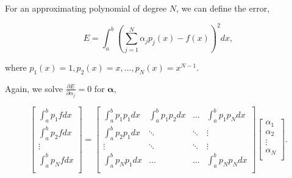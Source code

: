 \documentclass[12pt]{article}
\begin{document}
For an approximating polynomial of degree $N$, we can define the error,

\vspace{4mm}

$$ E = \int_{a}^{b} \left(\sum_{j=1}^N \alpha_j p_j (x) - f(x)\right)^2 dx, $$

\vspace{5mm}

where $p_1(x)=1, p_2(x) = x, ..., p_N(x)=x^{N-1}$.

\vspace{5mm}

Again, we solve $\frac{\partial E}{\partial \alpha_j} = 0$ for $\boldsymbol{\alpha}$,

\vspace{4mm}

\[
\begin{bmatrix}
	\int_{a}^{b} p_1 f dx \\[2ex]
	\int_{a}^{b} p_2 f dx \\[2ex]
	\vdots \\[2ex]
	\int_{a}^{b} p_N f dx \\[2ex]
\end{bmatrix} 
=
\begin{bmatrix}
  	\int_{a}^{b} p_1 p_1 dx & \int_{a}^{b} p_1 p_2 dx & \dots & \int_{a}^{b} p_1 p_N dx \\[2ex]
    \int_{a}^{b} p_2 p_1 dx & \ddots & \ddots & \vdots \\[2ex]
    \vdots & \ddots & \ddots & \vdots \\[2ex]
    \int_{a}^{b} p_N p_1 dx & \dots & \dots & \int_{a}^{b} p_N p_N dx \\[2ex]
\end{bmatrix}
\begin{bmatrix}
	\alpha_1 \\[2ex]
	\alpha_2 \\[2ex]
	\vdots \\[2ex]
	\alpha_N \\[2ex]
\end{bmatrix} .
\]
\end{document}
